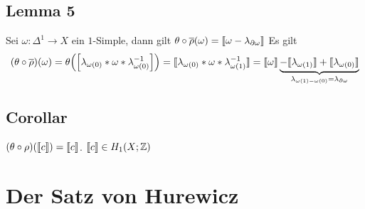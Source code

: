 \subsection{Lemma 5} %
\label{sub:1512}
Sei $\omega \colon \Delta^1 \to X$ ein $1$-Simple, dann gilt $\theta \circ \overline{\rho}(\omega) = \llbracket\omega - \lambda_{\partial \omega}\rrbracket $
Es gilt
\begin{align*}
	(\theta \circ \overline{\rho}) (\omega) = \theta \enbrace*{ \benbrace*{\lambda_{\omega(0)} * \omega * \lambda_{\omega(0)} ^{-1}} } =
	\homologieklasse{\lambda_{\omega(0)} * \omega * \lambda_{\omega(1)} ^{-1}} = \homologieklasse{\omega} \underbrace{- \homologieklasse{\lambda_{\omega(1)}} + 
	\homologieklasse{\lambda_{\omega(0)}} }_{\lambda_{\omega(1)- \omega(0)} = \lambda_{\partial \omega}}
\end{align*}

\subsection{Corollar} %
\label{sub:1513}
$(\theta \circ \rho) \enbrace*{\homologieklasse{c}} = \homologieklasse{c}$. $\llbracket c\rrbracket \in H_1(X;\mathbb{Z})$ 

\section*{Der Satz von Hurewicz} %
\label{sec:der_satz_von_hurewicz}

